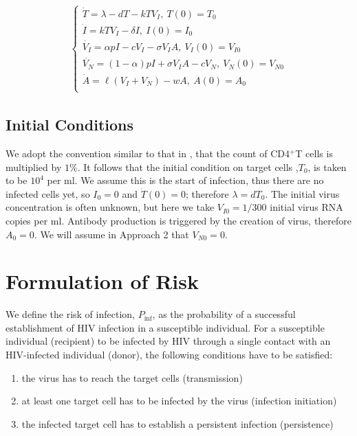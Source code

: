 \documentclass[]{elsarticle}
\newcommand{\Pinf}{P_{\text{inf}}}
\theoremstyle{definition}
\begin{document}
\begin{align}
\label{Approach II}
\begin{cases}
\dot{T} = \lambda-dT-kTV_I,\> T(0) = T_0 \\
\dot{I} = kTV_I-\delta I,\>I(0) = I_0 \\
\dot{V_I} = \alpha pI-cV_I-\sigma V_I A ,\>V_I(0) = V_{I0} \\
\dot{V_N} = (1-\alpha)pI+\sigma V_I A -cV_N ,\>V_N(0) = V_{N0}\\
\dot{A} = \ell(V_I+V_N)-wA,\>A(0) = A_0\\
\end{cases}
\end{align}

\subsection{Initial Conditions}
We adopt the convention similar to that in \cite{sachsenberg1998turnover}, that the count of CD4$^+$T cells is multiplied by $1\%$. It follows that the initial condition on target cells ,$T_0$, is taken to be $10^4$ per ml. We assume this is the start of infection, thus there are no infected cells yet, so $I_0 = 0$ and $\dot T(0)= 0$; therefore $\lambda = dT_0$. The initial virus concentration is often unknown, but here we take $V_{I0} = 1/300$ initial virus RNA copies per ml. Antibody production is triggered by the creation of virus, therefore $A_0 = 0$. We will assume in Approach 2 that $V_{N0} = 0$.


\section{Formulation of Risk}


We define the risk of infection, $\Pinf$, as the probability of a successful establishment of HIV infection in a susceptible individual. For a susceptible individual (recipient) to be infected by HIV through a single contact with an HIV-infected individual (donor), the following conditions have to be satisfied:

\begin{enumerate}
    \item the virus has to reach the target cells (transmission)
    \item at least one target cell has to be infected by the virus (infection initiation)
    \item the infected target cell has to establish a persistent infection (persistence)
\end{enumerate}
\end{document}
